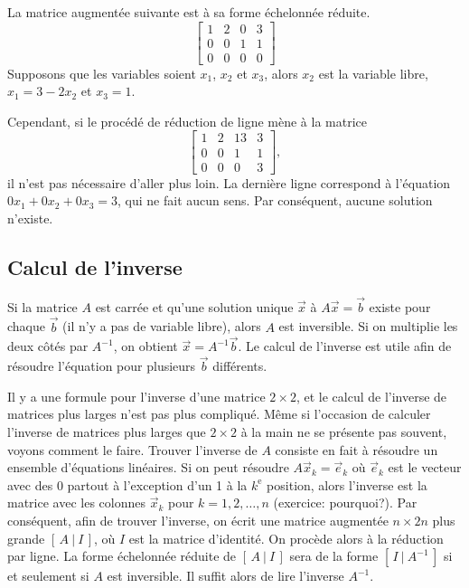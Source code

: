 \begin{example}
La matrice augmentée suivante est à sa forme échelonnée réduite.
\begin{equation*}
\left[
\begin{array}{ccc|c}
1 & 2 & 0 & 3 \\
0 & 0 & 1 & 1 \\
0 & 0 & 0 & 0
\end{array}
\right]
\end{equation*}
Supposons que les variables soient $x_1$, $x_2$ et $x_3$, alors $x_2$ est la variable libre, $x_1 = 3 - 2x_2$ et $x_3 = 1$.

\medskip

Cependant, si le procédé de réduction de ligne mène à la matrice
\begin{equation*}
\left[
\begin{array}{ccc|c}
1 & 2 & 13 & 3 \\
0 & 0 & 1 & 1 \\
0 & 0 & 0 & 3
\end{array}
\right]
,
\end{equation*}
il n’est pas nécessaire d’aller plus loin. La dernière ligne correspond à l'équation $0 x_1 + 0 x_2 + 0 x_3 = 3$, qui ne fait aucun sens. Par conséquent, aucune solution n’existe.
\end{example}

\subsection{Calcul de l'inverse}

Si la matrice $A$ est carrée et qu’une solution unique
$\vec{x}$ à $A \vec{x} = \vec{b}$ existe pour chaque $\vec{b}$ (il n’y a pas de variable libre), alors $A$ est inversible.
Si on multiplie les deux côtés par $A^{-1}$, on obtient $\vec{x} =
A^{-1} \vec{b}$.  Le calcul de l’inverse est utile afin de résoudre l’équation pour plusieurs $\vec{b}$ différents.

Il y a une formule pour l’inverse d’une matrice $2 \times 2$, et le calcul de l’inverse de matrices plus larges n’est pas plus compliqué. Même si l’occasion de calculer l’inverse de matrices plus larges que $2 \times 2$ à la main ne se présente pas souvent, voyons comment le faire. Trouver l'inverse de $A$ consiste en fait à résoudre un ensemble d'équations linéaires. Si on peut résoudre $A \vec{x}_k = \vec{e}_k$ où $\vec{e}_k$  est le vecteur avec des 0 partout à l’exception d’un 1 à la $k^{\text{e}}$ position, alors l'inverse est la matrice avec les colonnes $\vec{x}_k$ pour $k=1,2,\ldots,n$
(exercice: pourquoi?).  Par conséquent, afin de trouver l’inverse, on écrit une matrice augmentée $n
\times 2n$ plus grande $[ \,A ~|~ I\, ]$, où $I$ est la matrice d'identité. On procède alors à la réduction par ligne. La forme échelonnée réduite de $[ \,A ~|~ I\, ]$ 
sera de la forme $[ \,I ~|~ A^{-1}\, ]$ si et seulement si
$A$ est inversible. Il suffit alors de lire l’inverse $A^{-1}$.

